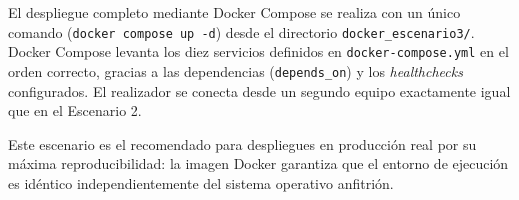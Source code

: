 El despliegue completo mediante Docker Compose se realiza con un único comando
(\texttt{docker compose up -d}) desde el directorio \texttt{docker\_escenario3/}.
Docker Compose levanta los diez servicios definidos en \texttt{docker-compose.yml}
en el orden correcto, gracias a las dependencias (\texttt{depends\_on}) y los
\textit{healthchecks} configurados. El realizador se conecta desde un segundo equipo
exactamente igual que en el Escenario 2.

Este escenario es el recomendado para despliegues en producción real por su máxima
reproducibilidad: la imagen Docker garantiza que el entorno de ejecución es idéntico
independientemente del sistema operativo anfitrión.


